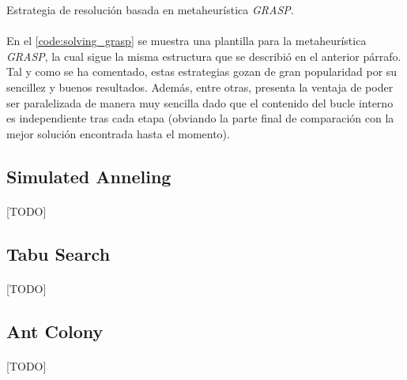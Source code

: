 \documentclass{subfiles}
\begin{document}
      \begin{algorithm}[ht]
        \SetAlgoLined
        \caption{Estrategia de resolución basada en metaheurística \emph{GRASP}.}
        \label{code:solving_grasp}
      \end{algorithm}

      \paragraph{}
      En el \cref{code:solving_grasp} se muestra una plantilla para la metaheurística \emph{GRASP}, la cual sigue la misma estructura que se describió en el anterior párrafo. Tal y como se ha comentado, estas estrategias gozan de gran popularidad por su sencillez y buenos resultados. Además, entre otras, presenta la ventaja de poder ser paralelizada de manera muy sencilla dado que el contenido del bucle interno es independiente tras cada etapa (obviando la parte final de comparación con la mejor solución encontrada hasta el momento).

      \subsection{Simulated Anneling}
      \label{sec:solving_simulated_anneling}

        \paragraph{}
        [TODO]

      \subsection{Tabu Search}
      \label{sec:solving_tabu}

        \paragraph{}
        [TODO]

      \subsection{Ant Colony}
      \label{sec:solving_ant_colony}

        \paragraph{}
        [TODO]
\end{document}
